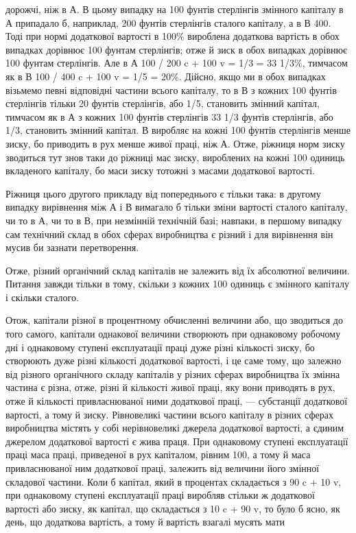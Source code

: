 дорожчі, ніж в А. В цьому випадку на 100 фунтів стерлінгів
змінного капіталу в А припадало б, наприклад, 200 фунтів
стерлінгів сталого капіталу, а в В 400. Тоді при нормі додаткової вартості в 100\% вироблена
додаткова вартість в обох випадках дорівнює 100 фунтам стерлінгів; отже й зиск в обох випадках
дорівнює 100 фунтам стерлінгів. Але в А 100 / 200 c + 100 v =
1/3 = 33 1/3\%, тимчасом як в В 100 / 400 c + 100 v = 1/5 = 20\%. Дійсно,
якщо ми в обох випадках візьмемо певні відповідні частини
всього капіталу, то в В з кожних 100 фунтів стерлінгів тільки
20 фунтів стерлінгів, або 1/5, становить змінний капітал, тимчасом як в А з кожних 100 фунтів
стерлінгів 33 1/3 фунтів стерлінгів, або 1/3, становить змінний капітал. В виробляє на кожні 100
фунтів стерлінгів менше зиску, бо приводить в рух менше
живої праці, ніж А. Отже, ріжниця норм зиску зводиться тут
знов таки до ріжниці мас зиску, вироблених на кожні 100 одиниць вкладеного капіталу, бо маси зиску
тотожні з масами додаткової вартості.

Ріжниця цього другого прикладу від попереднього є тільки
така: в другому випадку вирівнення між А і В вимагало б тільки
зміни вартості сталого капіталу, чи то в А, чи то в В, при незмінній технічній базі; навпаки, в
першому випадку сам технічний склад в обох сферах виробництва є різний і для вирівнення він мусив би
зазнати перетворення.

Отже, різний органічний склад капіталів не залежить від їх
абсолютної величини. Питання завжди тільки в тому, скільки
з кожних 100 одиниць є змінного капіталу і скільки сталого.

Отож, капітали різної в процентному обчисленні величини
або, що зводиться до того самого, капітали однакової величини
створюють при однаковому робочому дні і однаковому ступені
експлуатації праці дуже різні кількості зиску, бо створюють
дуже різні кількості додаткової вартості, і це саме тому, що
залежно від різного органічного складу капіталів у різних сферах виробництва їх змінна частина є
різна, отже, різні й кількості живої праці, яку вони приводять в рух, отже й кількості
привласнюваної ними додаткової праці, — субстанції додаткової
вартості, а тому й зиску. Рівновеликі частини всього капіталу
в різних сферах виробництва містять у собі нерівновеликі джерела додаткової вартості, а єдиним
джерелом додаткової вартості є жива праця. При однаковому ступені експлуатації праці маса праці,
приведеної в рух капіталом, рівним 100, а тому й
маса привласнюваної ним додаткової праці, залежить від величини
його змінної складової частини. Коли б капітал, який в процентах складається з 90 c + 10 v, при
однаковому ступені експлуатації праці виробляв стільки ж додаткової вартості або зиску, як капітал,
що складається з 10 c + 90 v, то було б ясно, як день,
що додаткова вартість, а тому й вартість взагалі мусять мати
